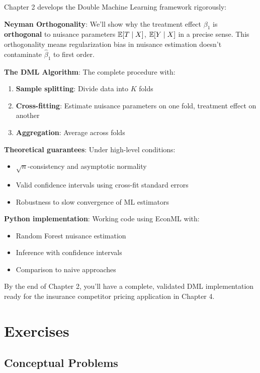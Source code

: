 Chapter 2 develops the Double Machine Learning framework rigorously:

\textbf{Neyman Orthogonality}: We'll show why the treatment effect
$\beta_1$ is \textbf{orthogonal} to nuisance parameters
$\mathbb{E}[T \mid X]$, $\mathbb{E}[Y \mid X]$ in a
precise sense. This orthogonality means regularization bias in nuisance
estimation doesn't contaminate $\hat{\beta}_1$ to first order.

\textbf{The DML Algorithm}: The complete procedure with:
\begin{enumerate}
\item \textbf{Sample splitting}: Divide data into $K$ folds
\item \textbf{Cross-fitting}: Estimate nuisance parameters on one fold, treatment effect on another
\item \textbf{Aggregation}: Average across folds
\end{enumerate}

\textbf{Theoretical guarantees}: Under high-level conditions:
\begin{itemize}
\item $\sqrt{n}$-consistency and asymptotic normality
\item Valid confidence intervals using cross-fit standard errors
\item Robustness to slow convergence of ML estimators
\end{itemize}

\textbf{Python implementation}: Working code using EconML with:
\begin{itemize}
\item Random Forest nuisance estimation
\item Inference with confidence intervals
\item Comparison to naive approaches
\end{itemize}

By the end of Chapter 2, you'll have a complete, validated DML
implementation ready for the insurance competitor pricing application in
Chapter 4.

\section{Exercises}\label{sec:ch01_exercises}

\subsection{Conceptual Problems}\label{_conceptual_problems}

